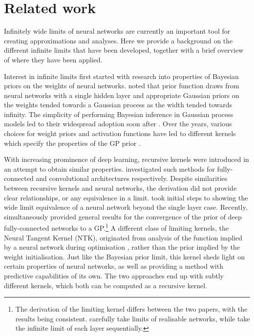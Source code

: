 \documentclass{article}
\theoremstyle{definition}
\begin{document}
\section{Related work}
Infinitely wide limits of neural networks are currently an important tool for creating approximations and analyses. Here we provide a background on the different infinite limits that have been developed, together with a brief overview of where they have been applied.

Interest in infinite limits first started with research into properties of Bayesian priors on the weights of neural networks. \citet{neal1996bayesian} noted that prior function draws from neural networks with a single hidden layer and appropriate Gaussian priors on the weights tended towards a Gaussian process as the width tended towards infinity. The simplicity of performing Bayesian inference in Gaussian process models led to their widespread adoption soon after \citep{williams1996gpr,gpml}. Over the years, various choices for weight priors and activation functions have led to different kernels which specify the properties of the GP prior \citep{williams1997inf,cho2009mkm}.

With increasing prominence of deep learning, recursive kernels were introduced in an attempt to obtain similar properties. \citet{cho2009mkm,mairal2014ckn} investigated such methods for fully-connected and convolutional architectures respectively. Despite similarities between recursive kernels and neural networks, the derivation did not provide clear relationships, or any equivalence in a limit. \citet{hazan2015} took initial steps to showing the wide limit equivalence of a neural network beyond the single layer case. Recently, \citet{matthews2018dnnlimit,lee2018dnnlimit} simultaneously provided general results for the convergence of the prior of deep fully-connected networks to a GP.\footnote{The derivation of the limiting kernel differs between the two papers, with the results being consistent. \citet{matthews2018dnnlimit} carefully take limits of realisable networks, while \citet{lee2018dnnlimit} take the infinite limit of each layer sequentially.%
} 
A different class of limiting kernels, the Neural Tangent Kernel (NTK), originated from analysis of the function implied by a neural network during optimisation \citep{jacot2018ntk}, rather than the prior implied by the weight initialisation. Just like the Bayesian prior limit, this kernel sheds light on certain properties of neural networks, as well as providing a method with predictive capabilities of its own. 
The two approaches end up with subtly different kernels, which both can be computed as a recursive kernel.
\end{document}

